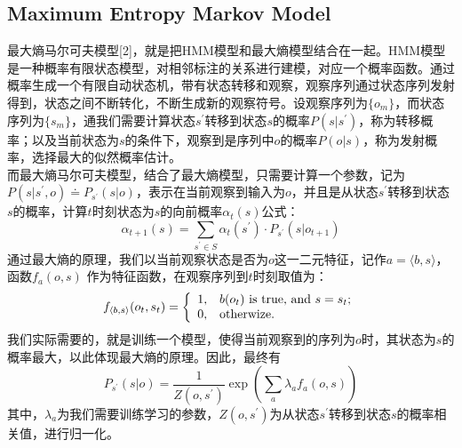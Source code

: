 \documentclass[11pt]{article}
\begin{document}
\subsection{Maximum Entropy Markov Model}
\hspace{1.6em} 最大熵马尔可夫模型[2]，就是把HMM模型和最大熵模型结合在一起。HMM模型是一种概率有限状态模型，对相邻标注的关系进行建模，对应一个概率函数。通过概率生成一个有限自动状态机，带有状态转移和观察，观察序列通过状态序列发射得到，状态之间不断转化，不断生成新的观察符号。设观察序列为$\{o_m\}$，而状态序列为$\{s_m\}$，通我们需要计算状态$s^\prime$转移到状态$s$的概率$P(s|s^\prime)$，称为转移概率；以及当前状态为$s$的条件下，观察到是序列中$o$的概率$P(o|s)$，称为发射概率，选择最大的似然概率估计。\\
\indent 而最大熵马尔可夫模型，结合了最大熵模型，只需要计算一个参数，记为$P(s|s^\prime, o)\doteq P_{s^\prime}(s|o)$，表示在当前观察到输入为$o$，并且是从状态$s^\prime$转移到状态$s$的概率，计算$t$时刻状态为$s$的向前概率$\alpha_{t}(s)$公式：
\begin{equation}\label{eq1}
\alpha_{t+1}(s) = \sum_{s^\prime \in S}\alpha_t(s^\prime)\cdot P_{s^\prime}(s|o_{t+1})
\end{equation}
\indent 通过最大熵的原理，我们以当前观察状态是否为$o$这一二元特征，记作$a=\langle b, s \rangle$，函数$f_a(o, s)$ 作为特征函数，在观察序列到$t$时刻取值为：
\begin{equation}\label{eq2}
f_{\langle b, s \rangle}(o_t, s_t) = \left\{
                                       \begin{array}{ll}
                                         1, & b(o_t)\text{ is true, and } s = s_t; \\
                                         0, & \hbox{otherwize.}
                                       \end{array}
                                     \right.
\end{equation}
\indent 我们实际需要的，就是训练一个模型，使得当前观察到的序列为$o$时，其状态为$s$的概率最大，以此体现最大熵的原理。因此，最终有
\begin{equation}\label{eq3}
P_{s^\prime}(s|o) = \frac{1}{Z(o, s^\prime)}\exp\left(\sum_{a}\lambda_a f_a(o,s)\right)
\end{equation}
\indent 其中，$\lambda_a$为我们需要训练学习的参数，${Z(o, s^\prime)}$为从状态$s^\prime$转移到状态$s$的概率相关值，进行归一化。
\end{document}
